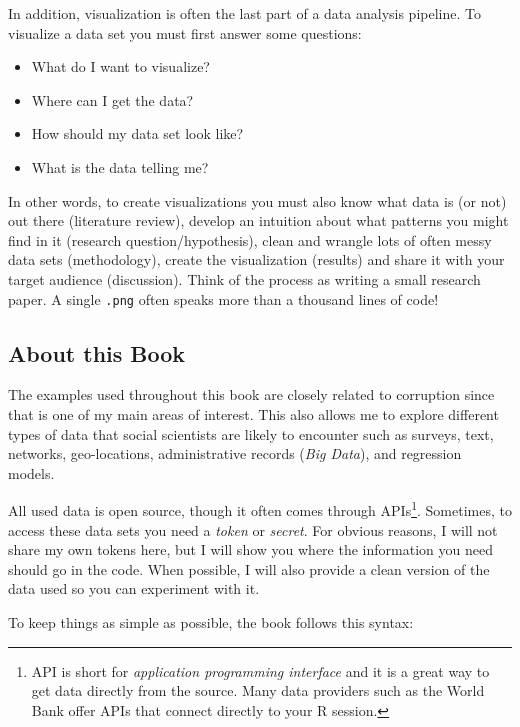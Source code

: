 \documentclass[
  letterpaper,
  DIV=11,
  numbers=noendperiod]{scrreprt}
\providecommand{\tightlist}{%
  \setlength{\itemsep}{0pt}\setlength{\parskip}{0pt}}\usepackage{longtable,booktabs,array}
\begin{document}
In addition, visualization is often the last part of a data analysis
pipeline. To visualize a data set you must first answer some questions:

\begin{itemize}
\tightlist
\item
  What do I want to visualize?
\item
  Where can I get the data?
\item
  How should my data set look like?
\item
  What is the data telling me?
\end{itemize}

In other words, to create visualizations you must also know what data is
(or not) out there (literature review), develop an intuition about what
patterns you might find in it (research question/hypothesis), clean and
wrangle lots of often messy data sets (methodology), create the
visualization (results) and share it with your target audience
(discussion). Think of the process as writing a small research paper. A
single \texttt{.png} often speaks more than a thousand lines of code!

\subsection*{About this Book}\label{about-this-book}

The examples used throughout this book are closely related to corruption
since that is one of my main areas of interest. This also allows me to
explore different types of data that social scientists are likely to
encounter such as surveys, text, networks, geo-locations, administrative
records (\emph{Big Data}), and regression models.

All used data is open source, though it often comes through
APIs\footnote{API is short for \emph{application programming interface}
  and it is a great way to get data directly from the source. Many data
  providers such as the World Bank offer APIs that connect directly to
  your R session.}. Sometimes, to access these data sets you need a
\emph{token} or \emph{secret}. For obvious reasons, I will not share my
own tokens here, but I will show you where the information you need
should go in the code. When possible, I will also provide a clean
version of the data used so you can experiment with it.

To keep things as simple as possible, the book follows this syntax:
\end{document}

